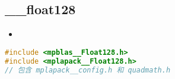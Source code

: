 
\begin{issues}
\issueDraft
\end{issues}


\subsection{__float128}
\begin{itemize}
\item 
\end{itemize}

\begin{lstlisting}[language=cpp]
#include <mpblas__Float128.h>
#include <mplapack__Float128.h>
// 包含 mplapack__config.h 和 quadmath.h
\end{lstlisting}